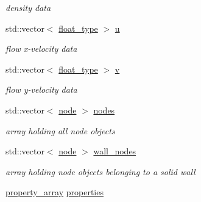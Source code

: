\begin{DoxyCompactItemize}
\begin{DoxyCompactList}\small\item\em density data \end{DoxyCompactList}\item 
\hypertarget{classlb_1_1lattice_ae181b7bc2afe7198e1a2f0a07f6934d7}{std\-::vector$<$ \hyperlink{namespacelb_a2b37d1585aef2d3da421ad0aedc6b11b}{float\-\_\-type} $>$ \hyperlink{classlb_1_1lattice_ae181b7bc2afe7198e1a2f0a07f6934d7}{u}}\label{classlb_1_1lattice_ae181b7bc2afe7198e1a2f0a07f6934d7}

\begin{DoxyCompactList}\small\item\em flow x-\/velocity data \end{DoxyCompactList}\item 
\hypertarget{classlb_1_1lattice_a12b9b5aebaab0ded9aae1f7db3089082}{std\-::vector$<$ \hyperlink{namespacelb_a2b37d1585aef2d3da421ad0aedc6b11b}{float\-\_\-type} $>$ \hyperlink{classlb_1_1lattice_a12b9b5aebaab0ded9aae1f7db3089082}{v}}\label{classlb_1_1lattice_a12b9b5aebaab0ded9aae1f7db3089082}

\begin{DoxyCompactList}\small\item\em flow y-\/velocity data \end{DoxyCompactList}\item 
\hypertarget{classlb_1_1lattice_a405a32d6566f9e429fec40627bfc1734}{std\-::vector$<$ \hyperlink{structlb_1_1node}{node} $>$ \hyperlink{classlb_1_1lattice_a405a32d6566f9e429fec40627bfc1734}{nodes}}\label{classlb_1_1lattice_a405a32d6566f9e429fec40627bfc1734}

\begin{DoxyCompactList}\small\item\em array holding all node objects \end{DoxyCompactList}\item 
\hypertarget{classlb_1_1lattice_acbb44921be1a76a1ecd38942859b57b3}{std\-::vector$<$ \hyperlink{structlb_1_1node}{node} $>$ \hyperlink{classlb_1_1lattice_acbb44921be1a76a1ecd38942859b57b3}{wall\-\_\-nodes}}\label{classlb_1_1lattice_acbb44921be1a76a1ecd38942859b57b3}

\begin{DoxyCompactList}\small\item\em array holding node objects belonging to a solid wall \end{DoxyCompactList}\item 
\hypertarget{classlb_1_1lattice_a2c1ad8828442666cbf331ae877815ed2}{\hyperlink{classlb_1_1property__array}{property\-\_\-array} \hyperlink{classlb_1_1lattice_a2c1ad8828442666cbf331ae877815ed2}{properties}}\label{classlb_1_1lattice_a2c1ad8828442666cbf331ae877815ed2}


\end{DoxyCompactItemize}
